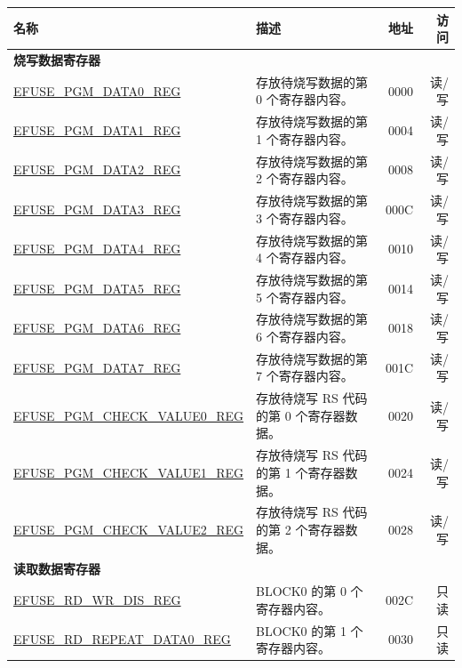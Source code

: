 \begin{longtable}{ | m{6cm} |m{7.2cm} | r| r | }
\hline\rowcolor{lightgray}
名称 & 描述 &  地址 & 访问 \\ \hline
\endhead
\multicolumn{4}{|l|}{\textbf{烧写数据寄存器}} \\ \hline
\hyperref[regdesc:EFUSEPGMDATANREG]{EFUSE\_PGM\_DATA0\_REG} & 存放待烧写数据的第 0 个寄存器内容。 & \hexprefix{}0000 & 读/写 \\ \hline
\hyperref[regdesc:EFUSEPGMDATANREG]{EFUSE\_PGM\_DATA1\_REG} & 存放待烧写数据的第 1 个寄存器内容。 & \hexprefix{}0004 & 读/写 \\ \hline
\hyperref[regdesc:EFUSEPGMDATANREG]{EFUSE\_PGM\_DATA2\_REG} & 存放待烧写数据的第 2 个寄存器内容。 & \hexprefix{}0008 & 读/写 \\ \hline
\hyperref[regdesc:EFUSEPGMDATANREG]{EFUSE\_PGM\_DATA3\_REG} & 存放待烧写数据的第 3 个寄存器内容。 & \hexprefix{}000C & 读/写 \\ \hline
\hyperref[regdesc:EFUSEPGMDATANREG]{EFUSE\_PGM\_DATA4\_REG} & 存放待烧写数据的第 4 个寄存器内容。 & \hexprefix{}0010 & 读/写 \\ \hline
\hyperref[regdesc:EFUSEPGMDATANREG]{EFUSE\_PGM\_DATA5\_REG} & 存放待烧写数据的第 5 个寄存器内容。 & \hexprefix{}0014 & 读/写 \\ \hline
\hyperref[regdesc:EFUSEPGMDATANREG]{EFUSE\_PGM\_DATA6\_REG} & 存放待烧写数据的第 6 个寄存器内容。 & \hexprefix{}0018 & 读/写 \\ \hline
\hyperref[regdesc:EFUSEPGMDATANREG]{EFUSE\_PGM\_DATA7\_REG} & 存放待烧写数据的第 7 个寄存器内容。 & \hexprefix{}001C & 读/写 \\ \hline
\hyperref[regdesc:EFUSEPGMCHECKVALUENREG]{EFUSE\_PGM\_CHECK\_VALUE0\_REG} & 存放待烧写 RS 代码的第 0 个寄存器数据。 & \hexprefix{}0020 & 读/写 \\ \hline
\hyperref[regdesc:EFUSEPGMCHECKVALUENREG]{EFUSE\_PGM\_CHECK\_VALUE1\_REG} & 存放待烧写 RS 代码的第 1 个寄存器数据。 & \hexprefix{}0024 & 读/写 \\ \hline
\hyperref[regdesc:EFUSEPGMCHECKVALUENREG]{EFUSE\_PGM\_CHECK\_VALUE2\_REG} & 存放待烧写 RS 代码的第 2 个寄存器数据。 & \hexprefix{}0028 & 读/写 \\ \hline
\multicolumn{4}{|l|}{\textbf{读取数据寄存器}} \\ \hline
\hyperref[regdesc:EFUSERDWRDISREG]{EFUSE\_RD\_WR\_DIS\_REG} & BLOCK0 的第 0 个寄存器内容。 & \hexprefix{}002C & 只读 \\ \hline
\hyperref[regdesc:EFUSERDREPEATDATA0REG]{EFUSE\_RD\_REPEAT\_DATA0\_REG} & BLOCK0 的第 1 个寄存器内容。 & \hexprefix{}0030 & 只读 \\ \hline

\end{longtable}
